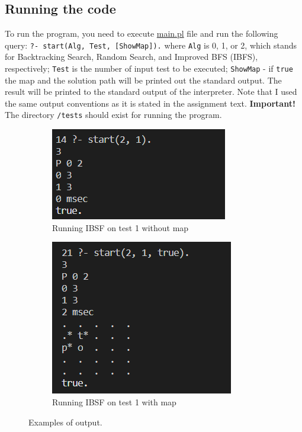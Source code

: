 \documentclass{article}
\begin{document}
\subsection{Running the code}
To run the program, you need to execute \url{main.pl} file and run the following query: \texttt{?- start(Alg, Test, [ShowMap]).} where \texttt{Alg} is 0, 1, or 2, which stands for Backtracking Search, Random Search, and Improved BFS (IBFS), respectively; \texttt{Test} is the number of input test to be executed; \texttt{ShowMap} - if \texttt{true} the map and the solution path will be printed out the standard output. The result will be printed to the standard output of the interpreter. Note that I used the same output conventions as it is stated in the assignment text. \textbf{Important!} The directory \texttt{/tests} should exist for running the program.
\begin{figure}[ht]
   	 \centering
     \begin{subfigure}[b]{0.45\textwidth}
         \centering
         \includegraphics[width=\textwidth]{images/image4.png}
         \caption{Running IBSF on test 1 without map}
         \label{fig:output1}
     \end{subfigure}
     \hfill
     \begin{subfigure}[b]{0.45\textwidth}
         \centering
         \includegraphics[width=\textwidth]{images/image5.png}
         \caption{Running IBSF on test 1 with map}
         \label{fig:output2}
     \end{subfigure}
     \caption{Examples of output.}
\end{figure} 
\end{document}
